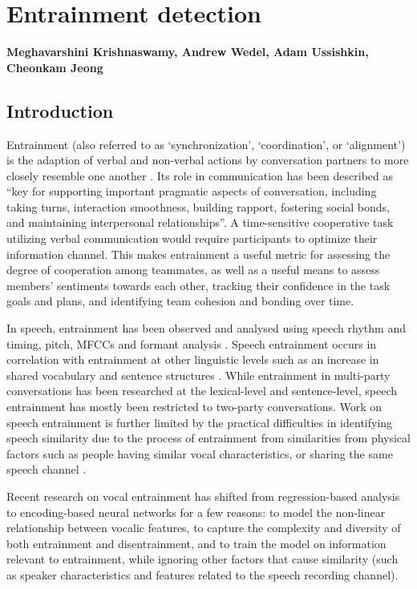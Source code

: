 \chapter{Entrainment detection}
\label{ch:entrainment}

\textbf{Meghavarshini Krishnaswamy, Andrew Wedel, Adam Ussishkin, Cheonkam Jeong} 
\section{Introduction}

    Entrainment (also referred to as `synchronization', `coordination', or `alignment') is the adaption of verbal and non-verbal actions by conversation partners to more closely resemble one another \parencite{borrie2014}. Its role in communication has been described as ``key for supporting important pragmatic aspects of conversation, including taking turns, interaction smoothness, building rapport, fostering social bonds, and maintaining interpersonal relationships''\parencite{borrie2019}. A time-sensitive cooperative task utilizing verbal communication would require participants to optimize their information channel. This makes entrainment a useful metric for assessing the degree of cooperation among teammates, as well as a useful means to assess members' sentiments towards each other, tracking their confidence in the task goals and plans, and identifying team cohesion and bonding over time.

    In speech, entrainment has been observed and analysed using speech rhythm and
    timing, pitch, MFCCs and formant analysis \parencite{reichel2018prosodic,borrie2019syncing}. Speech entrainment occurs in correlation with entrainment at other linguistic levels such as an increase in shared vocabulary and sentence structures \parencite{rahimi2017entrainment}. While entrainment in multi-party conversations has been researched at the lexical-level and sentence-level, speech entrainment has mostly been restricted to two-party conversations. Work on speech entrainment is further limited by the practical difficulties in identifying speech similarity due to the process of entrainment from similarities from physical factors such as people having similar vocal characteristics, or sharing the same speech channel \parencite{nasir2020}.

    Recent research on vocal entrainment has shifted from regression-based analysis to encoding-based neural networks for a few reasons: to model the non-linear relationship between vocalic features, to capture the complexity and diversity of both entrainment and disentrainment, and to train the model on information relevant to entrainment, while ignoring other factors that cause similarity (such as speaker characteristics and features related to the speech recording channel)\parencite{nasir2020}.


